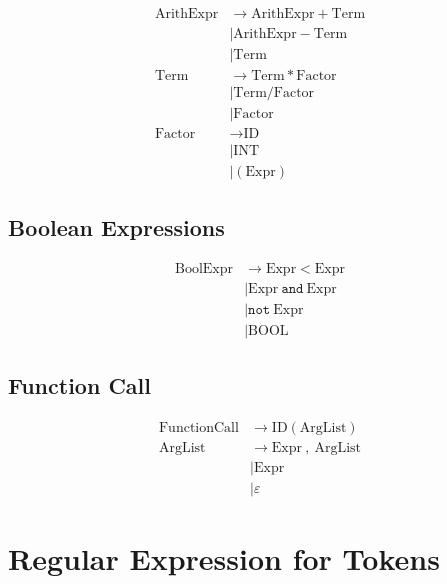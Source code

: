 \documentclass[12pt,a4paper]{article}
\begin{document}
\begin{align*}
\text{ArithExpr} &\rightarrow \text{ArithExpr} + \text{Term} \\
                 &\mid \text{ArithExpr} - \text{Term} \\
                 &\mid \text{Term} \\[6pt]
\text{Term} &\rightarrow \text{Term} * \text{Factor} \\
            &\mid \text{Term} / \text{Factor} \\
            &\mid \text{Factor} \\[6pt]
\text{Factor} &\rightarrow \text{ID} \\
              &\mid \text{INT} \\
              &\mid ( \text{Expr} )
\end{align*}

\subsection{Boolean Expressions}

\begin{align*}
\text{BoolExpr} &\rightarrow \text{Expr} < \text{Expr} \\
                &\mid \text{Expr}\ \texttt{and}\ \text{Expr} \\
                &\mid \texttt{not}\ \text{Expr} \\
                &\mid \text{BOOL}
\end{align*}

\subsection{Function Call}

\begin{align*}
\text{FunctionCall} &\rightarrow \text{ID} ( \text{ArgList} ) \\[6pt]
\text{ArgList} &\rightarrow \text{Expr}\ ,\ \text{ArgList} \\
               &\mid \text{Expr} \\
               &\mid \varepsilon
\end{align*}

\pagebreak
 
\section{Regular Expression for Tokens}

\end{document}
